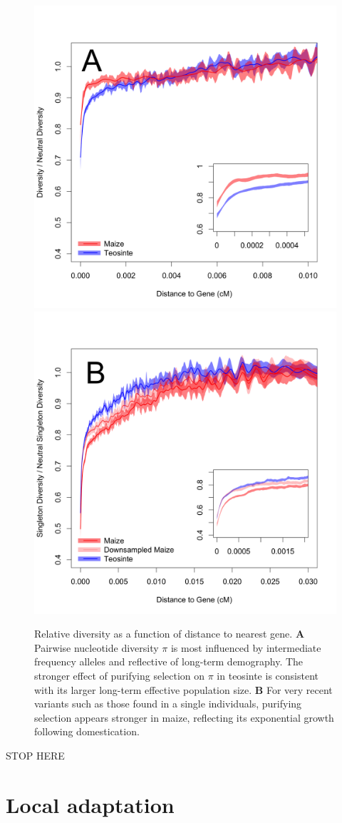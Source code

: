 \documentclass[11pt]{article}
\begin{document}
\begin{figure}[tb]
\centering
\includegraphics[width=.5\textwidth]{figs/distanceToGene_WithSignificance_Folded2_manuscript.png} \includegraphics[width=.5\textwidth]{figs/distanceToGene_WithSignificance_Singletons_Downsampled_threeLines_manuscript.png}
\caption{Relative diversity as a function of distance to nearest gene. 
\textbf{A} Pairwise nucleotide diversity $\pi$ is most influenced by intermediate frequency alleles and reflective of long-term demography. 
The stronger effect of purifying selection on $\pi$  in teosinte is consistent with its larger long-term effective population size. 
 \textbf{B} For very recent variants such as those found in a single individuals, purifying selection appears stronger in maize, reflecting its exponential growth following domestication. \label{fig:purify}}
\end{figure}

{
\color{red}  
\noindent\makebox[\linewidth]{\rule{\linewidth}{0.4pt}}
STOP HERE \\
\noindent\makebox[\linewidth]{\rule{\linewidth}{0.4pt}}
}






\section*{Local adaptation}
\end{document}
